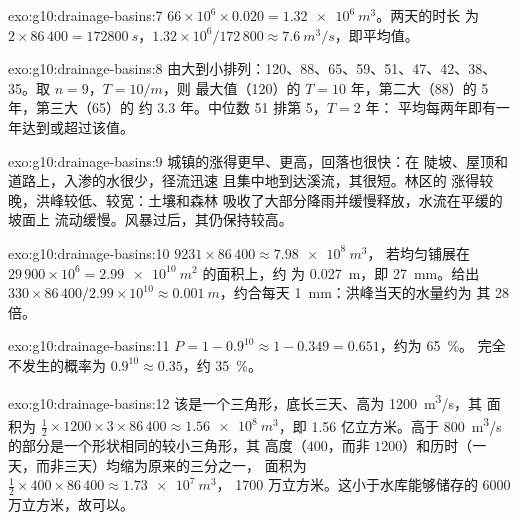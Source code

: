 \begin{solution}{exo:g10:drainage-basins:7}
$66 \times 10^6 \times 0.020 = \qty{1.32e6}{m^3}$。两天的时长
为 $2 \times 86\,400 = \qty{172800}{s}$，$1.32 \times 10^6/172\,800 \approx
\qty{7.6}{m^3/s}$，即平均值。
\end{solution}

\begin{solution}{exo:g10:drainage-basins:8}
由大到小排列：120、88、65、59、51、47、42、38、35。取 $n = 9$，$T = 10/m$，则
最大值（120）的 $T = 10$ 年，第二大（88）的 5 年，第三大（65）的
约 3.3 年。中位数 51 排第 5，$T = 2$ 年：
平均每两年即有一年达到或超过该值。
\end{solution}

\begin{solution}{exo:g10:drainage-basins:9}
城镇的涨得更早、更高，回落也很快：在
陡坡、屋顶和道路上，入渗的水很少，径流迅速
且集中地到达溪流，其很短。林区的
涨得较晚，洪峰较低、较宽：土壤和森林
吸收了大部分降雨并缓慢释放，水流在平缓的坡面上
流动缓慢。风暴过后，其仍保持较高。
\end{solution}

\begin{solution}{exo:g10:drainage-basins:10}
$9231 \times 86\,400 \approx \qty{7.98e8}{m^3}$，
若均匀铺展在 $29\,900 \times 10^6 = \qty{2.99e10}{m^2}$ 的面积上，约
为 \qty{0.027}{m}，即 \qty{27}{mm}。给出 $330 \times 86\,400/2.99 \times 10^{10}
\approx \qty{0.001}{m}$，约合每天 \qty{1}{mm}：洪峰当天的水量约为
其 28 倍。
\end{solution}

\begin{solution}{exo:g10:drainage-basins:11}
$P = 1 - 0.9^{10} \approx 1 - 0.349 = 0.651$，约为 \qty{65}{\percent}。
完全不发生的概率为 $0.9^{10} \approx 0.35$，约
\qty{35}{\percent}。
\end{solution}

\begin{solution}{exo:g10:drainage-basins:12}
该是一个三角形，底长三天、高为 \qty{1200}{m^3/s}，其
面积为 $\tfrac12 \times 1200 \times 3 \times 86\,400 \approx
\qty{1.56e8}{m^3}$，即 1.56 亿立方米。高于
\qty{800}{m^3/s} 的部分是一个形状相同的较小三角形，其
高度（$400$，而非 $1200$）和历时（一天，而非三天）均缩为原来的三分之一，
面积为 $\tfrac12 \times 400 \times 86\,400 \approx \qty{1.73e7}{m^3}$，
1700 万立方米。这小于水库能够储存的
6000 万立方米，故可以。
\end{solution}


